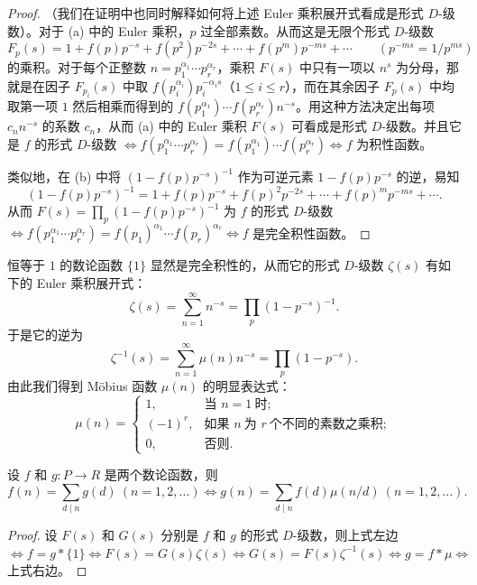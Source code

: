 \begin{proof}
（我们在证明中也同时解释如何将上述 Euler 乘积展开式看成是形式 $D$-级数）。对于 (a) 中的 Euler 乘积，$p$ 过全部素数。从而这是无限个形式 $D$-级数
\[
  F_p(s)=1+f(p)p^{-s}+f(p^2)p^{-2s}+\cdots+f(p^m)p^{-ms}+\cdots\qquad(p^{-ms}=1/p^{ms})
\]
的乘积。对于每个正整数 $n=p_1^{\alpha_1}\cdots p_r^{\alpha_r}$，乘积 $F(s)$ 中只有一项以 $n^s$ 为分母，那就是在因子 $F_{p_i}(s)$ 中取 $f(p_i^{\alpha_i})p_i^{-\alpha_is}$（$1\leqslant i\leqslant r$），而在其余因子 $F_p(s)$ 中均取第一项 $1$ 然后相乘而得到的 $f(p_1^{\alpha_1})\cdots f(p_r^{\alpha_r})n^{-s}$。用这种方法决定出每项 $c_nn^{-s}$ 的系数 $c_n$，从而 (a) 中的 Euler 乘积 $F(s)$ 可看成是形式 $D$-级数。并且它是 $f$ 的形式 $D$-级数 $\Leftrightarrow f(p_1^{\alpha_1}\cdots p_r^{\alpha_r})=f(p_1^{\alpha_1})\cdots f(p_r^{\alpha_r})\Leftrightarrow f$ 为积性函数。

类似地，在 (b) 中将 $(1-f(p)p^{-s})^{-1}$ 作为可逆元素 $1-f(p)p^{-s}$ 的逆，易知
\[
  (1-f(p)p^{-s})^{-1}=1+f(p)p^{-s}+f(p)^2p^{-2s}+\cdots+f(p)^mp^{-ms}+\cdots.
\]
从而 $F(s)=\prod_p(1-f(p)p^{-s})^{-1}$ 为 $f$ 的形式 $D$-级数 $\Leftrightarrow f(p_1^{\alpha_1}\cdots p_r^{\alpha_r})=f(p_1)^{\alpha_1}\cdots f(p_r)^{\alpha_r}\Leftrightarrow f$ 是完全积性函数。
\end{proof}

恒等于 $1$ 的数论函数 $\{1\}$ 显然是完全积性的，从而它的形式 $D$-级数 $\zeta(s)$ 有如下的 Euler 乘积展开式：
\[
  \zeta(s)=\sum_{n=1}^{\infty}n^{-s}=\prod_p(1-p^{-s})^{-1}.
\]
于是它的逆为
\[
  \zeta^{-1}(s)=\sum_{n=1}^{\infty}\mu(n)n^{-s}=\prod_p(1-p^{-s}).
\]
由此我们得到 Möbius 函数 $\mu(n)$ 的明显表达式：
\[
  \mu(n)=\begin{cases}
    1, & \text{当 } n=1\ \text{时};\\
    (-1)^r, & \text{如果 } n\ \text{为 } r\ \text{个不同的素数之乘积};\\
    0, & \text{否则}.
  \end{cases}
\]

\begin{lemma}\label{lem:ch4-3}
设 $f$ 和 $g\colon P\to R$ 是两个数论函数，则
\[
  f(n)=\sum_{d\mid n}g(d)\ (n=1,2,\dots)
  \Leftrightarrow g(n)=\sum_{d\mid n}f(d)\mu(n/d)\ (n=1,2,\dots).
\]
\end{lemma}

\begin{proof}
设 $F(s)$ 和 $G(s)$ 分别是 $f$ 和 $g$ 的形式 $D$-级数，则上式左边 $\Leftrightarrow f=g*\{1\}\Leftrightarrow F(s)=G(s)\zeta(s)\Leftrightarrow G(s)=F(s)\zeta^{-1}(s)\Leftrightarrow g=f*\mu\Leftrightarrow$ 上式右边。
\end{proof}

